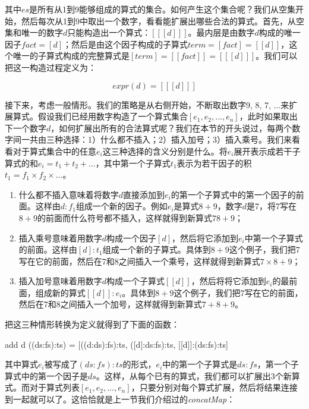 \documentclass[b5paper]{ctexart}
\begin{document}
其中$es$是所有从1到9能够组成的算式的集合。如何产生这个集合呢？我们从空集开始，然后每次从1到9中取出一个数字，看看能扩展出哪些合法的算式。首先，从空集和唯一的数字$d$只能构造出一个算式：$[[[d]]]$。最内层是由数字$d$构成的唯一因子$fact = [d]$；然后是由这个因子构成的子算式$term = [fact] = [[d]]$，这个唯一的子算式构成的完整算式是$[term] = [[fact]] = [[[d]]]$。我们可以把这一构造过程定义为：

\[
expr(d) = [[[d]]]
\]

接下来，考虑一般情形。我们的策略是从右侧开始，不断取出数字9, 8, 7, ...来扩展算式。假设我们已经用数字构造了一个算式集合$[e_1, e_2, ..., e_n]$，此时如果取出下一个数字$d$，如何扩展出所有的合法算式呢？我们在本节的开头说过，每两个数字间一共由三种选择：1）什么都不插入；2）插入加号；3）插入乘号。我们来看看对于算式集合中的任意$e_i$这三种选择的含义分别是什么。将$e_i$展开表示成若干子算式的和$e_i = t_1 + t_2 + ...$，其中第一个子算式$t_1$表示为若干因子的积$t_1 = f_1 \times f_2 \times ...$。

\begin{enumerate}
\item 什么都不插入意味着将数字$d$直接添加到$e_i$的第一个子算式中的第一个因子的前面。这样由$d:f_1$组成一个新的因子。例如$e_i$是算式$8 + 9$，数字$d$是7，将7写在$8+9$的前面而什么符号都不插入，这样就得到新算式$78 + 9$；
\item 插入乘号意味着用数字$d$构成一个因子$[d]$，然后将它添加到$e_i$中第一个子算式的前面。这样由$[d]:t_1$组成一个新的子算式。具体到$8 + 9$这个例子，我们把7写在它的前面，然后在7和8之间插入一个乘号，这样就得到新算式$7 \times 8 + 9$；
\item 插入加号意味着用数字$d$构成一个子算式$[[d]]$，然后将将它添加到$e_i$的最前面，组成新的算式$[[d]]:e_i$。具体到$8 + 9$这个例子，我们把7写在它的前面，然后在7和8之间插入一个加号，这样就得到新算式$7 + 8 + 9$。
\end{enumerate}

把这三种情形转换为定义就得到了下面的函数：

\begin{Haskell}
add d ((ds:fs):ts) = [((d:ds):fs):ts,
                      ([d]:ds:fs):ts,
                      [[d]]:(ds:fs):ts]
\end{Haskell}

其中算式$e_i$被写成了$(ds:fs):ts$的形式，$e_i$中的第一个子算式是$ds:fs$，第一个子算式中的第一个因子是$ds$。这样，从每个已有的算式，我们都可以扩展出3个新算式。而对于算式列表$[e_1, e_2, ..., e_n]$，只要分别对每个算式扩展，然后将结果连接到一起就可以了。这恰恰就是上一节我们介绍过的\textit{concatMap}：
\end{document}
